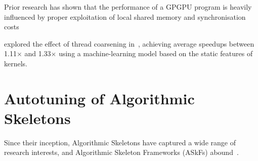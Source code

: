 Prior research has shown that the performance of a GPGPU program is
heavily influenced by proper exploitation of local shared memory and
synchronisation costs~\cite{Ryoo2008a, Lee2010} 




\citeauthor{Magni2014} explored the effect of thread coarsening
in~\cite{Magni2014}, achieving average speedups between 1.11$\times$
and 1.33$\times$ using a machine-learning model based on the static
features of kernels.



\section{Autotuning of Algorithmic Skeletons}


Since their inception, Algorithmic Skeletons have captured a wide
range of research interests, and Algorithmic Skeleton Frameworks
(ASkFs) abound~\cite{Gonz2010}.



